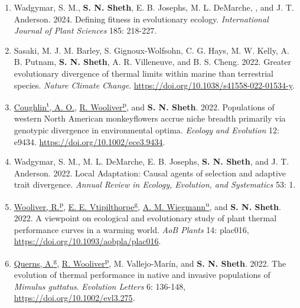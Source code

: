 \documentclass[11pt,english]{article}\usepackage[]{graphicx}\usepackage[]{xcolor}
\newcommand\reverselabel[1]{%
  \def\theenumi{}%
  \renewcommand\makelabel{\makebox[\dimexpr\labelwidth-3pt\relax][r]{%
    \the\numexpr#1-\value{enumi}+1\relax}}}%
\begin{document}
\begin{hangparas}{.5in}{1}
\begin{enumerate}
\reverselabel{31} %

\item Wadgymar, S. M., \textbf{S. N. Sheth}, E. B. Josephs, M. L. DeMarche, , and J. T. Anderson. 2024. Defining fitness in evolutionary ecology. \emph{International Journal of Plant Sciences} 185: 218-227. %

\item Sasaki, M. J. M. Barley, S. Gignoux-Wolfsohn, C. G. Hays, M. W. Kelly, A. B. Putnam, \textbf{S. N. Sheth}, A. R. Villeneuve, and B. S. Cheng. 2022. Greater evolutionary divergence of thermal limits within marine than terrestrial species. \emph{Nature Climate Change}. \url{https://doi.org/10.1038/s41558-022-01534-y}.

\item \underline{Coughlin\textsuperscript{t}, A. O.}, \underline{R. Wooliver\textsuperscript{p}}, and \textbf{S. N. Sheth}. 2022. Populations of western North American monkeyflowers accrue niche breadth primarily via genotypic divergence in environmental optima. \emph{Ecology and Evolution} 12: e9434. \url{https://doi.org/10.1002/ece3.9434}. 

\item Wadgymar, S. M., M. L. DeMarche, E. B. Josephs, \textbf{S. N. Sheth}, and J. T. Anderson. 2022. Local Adaptation: Causal agents of selection and adaptive trait divergence. \emph{Annual Review in Ecology, Evolution, and Systematics} 53: 1. %

\item \underline{Wooliver, R.\textsuperscript{p}}, \underline{E. E. Vtipilthorpe\textsuperscript{g}}, \underline{A. M. Wiegmann\textsuperscript{u}}, and \textbf{S. N. Sheth}. 2022. A viewpoint on ecological and evolutionary study of plant thermal performance curves in a warming world. \emph{AoB Plants} 14: plac016, \url{https://doi.org/10.1093/aobpla/plac016}. 

\item \underline{Querns, A.\textsuperscript{g}}, \underline{R. Wooliver\textsuperscript{p}}, M. Vallejo-Mar\'in, and \textbf{S. N. Sheth}. 2022. The evolution of thermal performance in native and invasive populations of \emph{Mimulus guttatus}. \emph{Evolution Letters} 6: 136-148, \url{https://doi.org/10.1002/evl3.275}.


\end{enumerate}
\end{hangparas}
\end{document}
